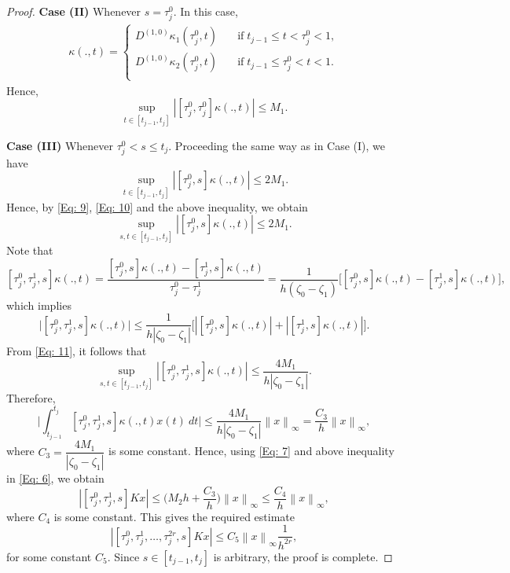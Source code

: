 \documentclass[10pt,a4paper]{amsart}
\newcommand{\norm}[1]{\left\lVert #1\right\rVert}
\begin{document}
\begin{proof}
	\noindent	
	\textbf{Case (II)}
	Whenever $s = \tau_j^0$. In this case,
	\begin{align*}
		[\tau_j^0,\tau_j^0] \kappa(.,t) = \begin{cases}
			D^{(1,0)}\kappa_1(\tau_j^0,t)  \quad &\text{if}\; t_{j-1} \le t < \tau_j^0 < 1,\\
			D^{(1,0)}\kappa_2(\tau_j^0,t)  \quad &\text{if}\; t_{j-1} \le \tau_j^0 < t  < 1.\\	
		\end{cases} 
	\end{align*}
	Hence, 
	\begin{equation}\label{Eq: 10}
		\sup_{t \in [t_{j-1},t_j]}\left|[\tau_j^0,\tau_j^0]\kappa(.,t)\right| \le M_1.
	\end{equation}
	
	\noindent
	\textbf{Case (III)}
	Whenever $\tau_j^0<s \le t_j$. Proceeding the same way as in Case (I), we have
	\begin{equation*}
		\sup_{t \in [t_{j-1},t_j]}\left|[\tau_j^0,s]\kappa(.,t)\right| \le 2M_1.
	\end{equation*}
	Hence, by \eqref{Eq: 9}, \eqref{Eq: 10} and the above inequality, we obtain
	\begin{equation}\label{Eq: 11}
		\sup_{s,t \in [t_{j-1},t_j]}\left|[\tau_j^0,s]\kappa(.,t)\right| \le 2M_1.
	\end{equation}
	Note that
	$$
	[\tau_j^0,\tau_j^1,s]\kappa(.,t) =\dfrac{[\tau_j^0,s]\kappa(.,t)-[\tau_j^1,s]\kappa(.,t)}{\tau_j^0-\tau_j^1} 
	= \dfrac{1}{h(\zeta_0-\zeta_1)} \bigg [ [\tau_j^0,s]\kappa(.,t)-[\tau_j^1,s]\kappa(.,t) \bigg ],
	$$
	which implies
	$$
	\bigg |[\tau_j^0,\tau_j^1,s]\kappa(.,t) \bigg| \le \dfrac{1}{h |\zeta_0-\zeta_1|} \bigg [ \left |[\tau_j^0,s]\kappa(.,t)\right |+\left |[\tau_j^1,s]\kappa(.,t) \right | \bigg ].
	$$
	From \eqref{Eq: 11}, it follows that
	$$
	\sup_{s,t \in [t_{j-1},t_j]}\left|[\tau_j^0,\tau_j^1,s]\kappa(.,t)\right| \le \dfrac{4M_1}{h |\zeta_0-\zeta_1|}.
	$$
	Therefore, 
	$$
	\bigg |\int_{t_{j-1}}^{t_j} [\tau_j^0,\tau_j^1,s] \kappa(.,t) x(t) ~dt \bigg | 
	\le \dfrac{4M_1}{h |\zeta_0-\zeta_1|}\norm{x}_\infty =  \dfrac{C_3}{h}\norm{x}_\infty,
	$$
	where $C_3=\dfrac{4M_1}{|\zeta_0-\zeta_1|}$ is some constant.
	Hence, using \eqref{Eq: 7} and above inequality in \eqref{Eq: 6}, we obtain
	$$
	\left|[\tau_j^0,\tau_j^1,s]Kx \right| \le \bigg ( M_2 h + \dfrac{C_3}{h}\bigg)\norm{x}_\infty \le \dfrac{C_4}{h}\norm{x}_\infty,
	$$
	where $C_4$ is some constant. This gives the required estimate
	$$
	\left|[\tau_j^0,\tau_j^1,\ldots, \tau_j^{2r}, s]Kx \right| \le C_5 \norm{x}_\infty \dfrac{1}{h^{2r}},
	$$
	for some constant $C_5$. Since $s \in [t_{j-1},t_j]$ is arbitrary, the proof is complete.
\end{proof}
\end{document}
